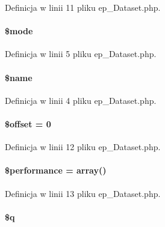 Definicja w linii 11 pliku ep\-\_\-\-Dataset.\-php.

\hypertarget{classep___dataset_a3aaf40baac36e278c7d7c9139df1750c}{
\paragraph[{\$mode}]{\setlength{\rightskip}{0pt plus 5cm}\$mode}}\label{classep___dataset_a3aaf40baac36e278c7d7c9139df1750c}


Definicja w linii 5 pliku ep\-\_\-\-Dataset.\-php.

\hypertarget{classep___dataset_ab2fc40d43824ea3e1ce5d86dee0d763b}{
\paragraph[{\$name}]{\setlength{\rightskip}{0pt plus 5cm}\$name}}\label{classep___dataset_ab2fc40d43824ea3e1ce5d86dee0d763b}


Definicja w linii 4 pliku ep\-\_\-\-Dataset.\-php.

\hypertarget{classep___dataset_aec4de82415d7f05cb9748d12d3a95a87}{
\paragraph[{\$offset}]{\setlength{\rightskip}{0pt plus 5cm}\$offset = 0}}\label{classep___dataset_aec4de82415d7f05cb9748d12d3a95a87}


Definicja w linii 12 pliku ep\-\_\-\-Dataset.\-php.

\hypertarget{classep___dataset_a91d3d1509ebebbe642c6c820a752c75c}{
\paragraph[{\$performance}]{\setlength{\rightskip}{0pt plus 5cm}\$performance = array()}}\label{classep___dataset_a91d3d1509ebebbe642c6c820a752c75c}


Definicja w linii 13 pliku ep\-\_\-\-Dataset.\-php.

\hypertarget{classep___dataset_abb0f8f809252372e25f48d52b63ef29d}{
\paragraph[{\$q}]{\setlength{\rightskip}{0pt plus 5cm}\$q}}\label{classep___dataset_abb0f8f809252372e25f48d52b63ef29d}


